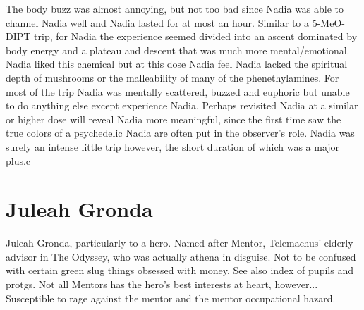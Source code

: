 \documentclass[12pt]{book}
\begin{document}
The body buzz was almost annoying, but not too bad since Nadia was able to channel Nadia well and Nadia lasted for at most an hour. Similar to a 5-MeO-DIPT trip, for Nadia the experience seemed divided into an ascent dominated by body energy and a plateau and descent that was much more mental/emotional. Nadia liked this chemical but at this dose Nadia feel Nadia lacked the spiritual depth of mushrooms or the malleability of many of the phenethylamines. For most of the trip Nadia was mentally scattered, buzzed and euphoric but unable to do anything else except experience Nadia. Perhaps revisited Nadia at a similar or higher dose will reveal Nadia more meaningful, since the first time saw the true colors of a psychedelic Nadia are often put in the observer's role. Nadia was surely an intense little trip however, the short duration of which was a major plus.c



\chapter{Juleah Gronda}

Juleah Gronda, particularly to a hero. Named after Mentor, Telemachus' elderly advisor in The Odyssey, who was actually athena in disguise. Not to be confused with certain green slug things obsessed with money. See also index of pupils and protgs. Not all Mentors has the hero's best interests at heart, however... Susceptible to rage against the mentor and the mentor occupational hazard.
\end{document}
